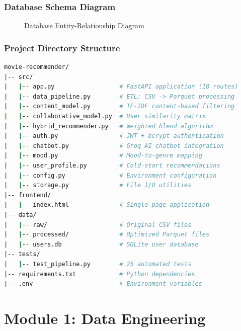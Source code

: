 \documentclass[12pt,a4paper]{report}
\begin{document}
\subsection{Database Schema Diagram}

\begin{figure}[H]
\centering
{}
\caption{Database Entity-Relationship Diagram}
\label{fig:er_diagram}
\end{figure}

\subsection{Project Directory Structure}

\begin{lstlisting}[language=bash, caption={CineMatch Project Structure}]
movie-recommender/
|-- src/
|   |-- app.py                  # FastAPI application (18 routes)
|   |-- data_pipeline.py        # ETL: CSV -> Parquet processing
|   |-- content_model.py        # TF-IDF content-based filtering
|   |-- collaborative_model.py  # User similarity matrix
|   |-- hybrid_recommender.py   # Weighted blend algorithm
|   |-- auth.py                 # JWT + bcrypt authentication
|   |-- chatbot.py              # Groq AI chatbot integration
|   |-- mood.py                 # Mood-to-genre mapping
|   |-- user_profile.py         # Cold-start recommendations
|   |-- config.py               # Environment configuration
|   |-- storage.py              # File I/O utilities
|-- frontend/
|   |-- index.html              # Single-page application
|-- data/
|   |-- raw/                    # Original CSV files
|   |-- processed/              # Optimized Parquet files
|   |-- users.db                # SQLite user database
|-- tests/
|   |-- test_pipeline.py        # 25 automated tests
|-- requirements.txt            # Python dependencies
|-- .env                        # Environment variables
\end{lstlisting}

\chapter{Module 1: Data Engineering}
\end{document}
